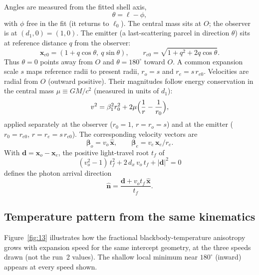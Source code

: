 \documentclass[11pt,a4paper]{article}
\begin{document}
Angles are measured from the fitted shell axis,
\begin{equation}
\label{eq:theta}
\theta=\ell-\phi,
\end{equation}
with \(\phi\) free in the fit (it returns to \(\ell_0\)). The central mass sits at \(O\); the observer is at \((d_1,0)=(1,0)\). The emitter (a last-scattering parcel in direction \(\theta\)) sits at reference distance \(q\) from the observer:
\begin{equation}
\label{eq:xe0}
\mathbf{x}_{e0}=(1+q\cos\theta,\ q\sin\theta),
\qquad
r_{e0}=\sqrt{1+q^{2}+2q\cos\theta}.
\end{equation}
Thus \(\theta=0\) points away from \(O\) and \(\theta=180^\circ\) toward \(O\). A common expansion scale \(s\) maps reference radii to present radii, \(r_o=s\) and \(r_e=s\,r_{e0}\). Velocities are radial from \(O\) (outward positive). Their magnitudes follow energy conservation in the central mass \(\mu\equiv GM/c^{2}\) (measured in units of \(d_1\)):
\begin{equation}
\label{eq:v2}
v^{2}=\beta_{1}^{2} r_{0}^{2}+2\mu\Bigl(\frac{1}{r}-\frac{1}{r_{0}}\Bigr),
\end{equation}
applied separately at the observer (\(r_{0}=1\), \(r=r_o=s\)) and at the emitter (\(r_{0}=r_{e0}\), \(r=r_e=s\,r_{e0}\)). The corresponding velocity vectors are
\begin{equation}
\label{eq:beta}
\boldsymbol{\beta}_{o}=v_{o}\,\hat{\mathbf{x}},
\qquad
\boldsymbol{\beta}_{e}=v_{e}\,\mathbf{x}_{e}/r_{e}.
\end{equation}
With \(\mathbf{d}=\mathbf{x}_{o}-\mathbf{x}_{e}\), the positive light-travel root \(t_{f}\) of
\begin{equation}
\label{eq:tf}
(v_{o}^{2}-1)\,t_{f}^{2}+2\,d_{x}\,v_{o}\,t_{f}+|\mathbf{d}|^{2}=0
\end{equation}
defines the photon arrival direction
\begin{equation}
\label{eq:nhat}
\hat{\mathbf{n}}=\frac{\mathbf{d}+v_{o}t_{f}\,\hat{\mathbf{x}}}{t_{f}}.
\end{equation}

\subsection{Temperature pattern from the same kinematics}

Figure~\ref{fig:13} illustrates how the fractional blackbody-temperature anisotropy grows with expansion speed for the same intercept geometry, at the three speeds drawn (not the run~2 values). The shallow local minimum near \(180^{\circ}\) (inward) appears at every speed shown.
\end{document}
